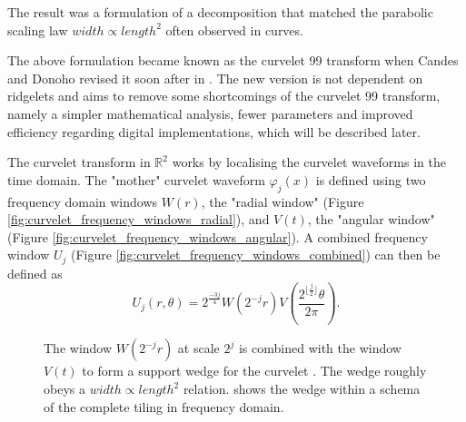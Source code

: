 The result was a formulation of a decomposition that matched the parabolic
scaling law $width \propto length^2$ often observed in curves.

The above formulation became known as the curvelet 99 transform when Candes and
Donoho revised it soon after in \autocite{candes_new_2004}. The new version is
not dependent on ridgelets and aims to remove some shortcomings of the curvelet
99 transform, namely a simpler mathematical analysis, fewer parameters and
improved efficiency regarding digital implementations, which will be described
later.

The curvelet transform in $\mathbb{R}^2$ works by localising the curvelet
waveforms in the time domain. The "mother" curvelet waveform $\varphi_j(x)$ is
defined using two frequency domain windows $W(r)$, the "radial window" (Figure
\ref{fig:curvelet_frequency_windows_radial}), and $V(t)$, the "angular window"
(Figure \ref{fig:curvelet_frequency_windows_angular}). A combined frequency
window $U_j$ (Figure \ref{fig:curvelet_frequency_windows_combined}) can then be defined as
\begin{equation*}
    U_j(r, \theta) = 2^\frac{-3j}{4} W(2^{-j}r) V(\frac{2^{\lfloor\frac{j}{2}\rfloor}\theta}{2 \pi}).
\end{equation*}

\begin{figure}[h]
    \centering
    \quad
    \quad
    \quad
    \caption[Curvelet frequency windows]{
        The window $W(2^{-j}r)$ at scale $2^j$
         is combined with the
        window $V(t)$  to form a
        support wedge for the curvelet
        . The wedge roughly
        obeys a $width \propto length^2$ relation.  shows the wedge within a schema of the complete tiling in frequency domain.
    }
    \label{fig:curvelet_frequency_windows}
\end{figure}

